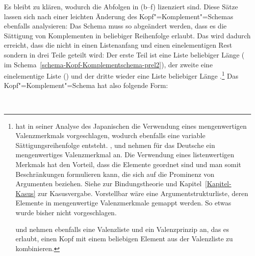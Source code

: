 Es bleibt zu klären, wodurch die Abfolgen in (b--f) lizenziert sind. Diese
Sätze lassen sich nach einer leichten Änderung des Kopf"=Komplement"=Schemas ebenfalls
analysieren: Das Schema muss so abgeändert werden, dass es die Sättigung von Komplementen
in beliebiger Reihenfolge erlaubt. Das wird dadurch erreicht, dass die \compsl nicht
in einen Listenanfang und einen einelementigen Rest sondern in drei Teile geteilt wird: Der erste
Teil ist eine Liste beliebiger Länge (\, im Schema~\ref{schema-Kopf-Komplementschema-prel2}), der zweite eine einelementige Liste () und der dritte wieder eine
Liste beliebiger Länge .\footnote{
  \citet{Gunji86a} hat in seiner Analyse des Japanischen die Verwendung eines
  mengenwertigen Valenzmerkmals vorgeschlagen, wodurch ebenfalls eine variable Sättigungsreihenfolge
  entsteht. \citet{HN89a}, \citet{Pollard90a} und \citet*{EEU92a} nehmen für das Deutsche
  ein mengenwertiges Valenzmerkmal an. Die Verwendung eines listenwertigen Merkmals hat den
  Vorteil, dass die Elemente geordnet sind und man somit Beschränkungen formulieren kann, die sich auf
  die Prominenz von Argumenten beziehen. Siehe  zur Bindungstheorie und
  Kapitel~\ref{Kapitel-Kasus} zur Kasusvergabe. Vorstellbar wäre eine Argumentstrukturliste, deren
  Elemente in mengenwertige Valenzmerkmale gemappt werden. So etwas wurde bisher nicht vorgeschlagen.

  \citet[]{FR92} und \citet[--223]{Kiss95b} nehmen ebenfalls eine Valenzliste und ein Valenzprinzip an, das es erlaubt,
  einen Kopf mit einem beliebigen Element aus der Valenzliste zu kombinieren.%
}
Das Kopf"=Komplement"=Schema hat also folgende Form:
\begin{samepage}
\begin{schema}
\label{schema-Kopf-Komplementschema-prel2}
 \impl\\
\end{schema}
\end{samepage}
